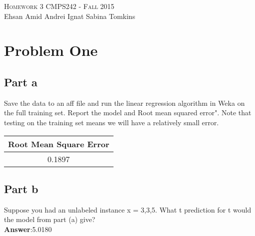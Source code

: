 \documentclass{article}
\begin{document}
\begin{center}
\Huge{\textsc{Homework 3}} 
\Large\textsc{CMPS242 - Fall 2015}\\

\large{Ehsan Amid \hfill Andrei Ignat  \hfill Sabina Tomkins} 
\end{center}

\section{Problem One}
\subsection{Part a}
Save the data to an aff file and run the linear regression algorithm in Weka on the full training set. Report the model and Root mean squared error". Note that testing on the training set means we will have a relatively small error.

\begin{table}[htbp]
    \centering
  
    \begin{tabular}{|c|}
    \hline
        Root Mean Square Error \\ 
            \hline
         0.1897\\
             \hline
      
    \end{tabular}
\end{table}

\subsection{Part b} 
Suppose you had an unlabeled instance x = 3,3,5. What t prediction for t would the model from part (a) give?\\

\textbf{Answer}:5.0180
\end{document}
